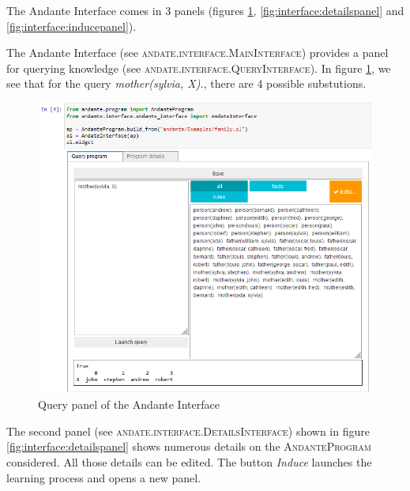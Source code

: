 \documentclass{article}
\begin{document}
The Andante Interface comes in 3 panels (figures
\ref{fig:interface:querypanel}, \ref{fig:interface:detailspanel} and
\ref{fig:interface:inducepanel}).

The Andante Interface (see \textsc{andate.interface.MainInterface}) provides a
panel for querying knowledge (see \textsc{andate.interface.QueryInterface}). In
figure \ref{fig:interface:querypanel}, we see that for the query
\textit{mother(sylvia, X).}, there are 4 possible substutions.

\begin{figure}[h!]
    \includegraphics[width = \textwidth]{images/Interface - query results.PNG}
    \caption{Query panel of the Andante Interface}
    \label{fig:interface:querypanel}
\end{figure}

The second panel (see \textsc{andate.interface.DetailsInterface}) shown in
figure \ref{fig:interface:detailspanel} shows numerous details on the
\textsc{AndanteProgram} considered. All those details can be edited. The button
\textit{Induce} launches the learning process and opens a new panel.
\end{document}
